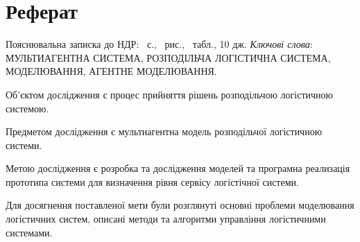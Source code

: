\section*{Реферат}
Пояснювальна записка до НДР: \pageref{LastPage}~с., \totalfigures~рис., \totaltables~табл., 10 дж. \bigbreak
\textit{Ключові слова}: \MakeUppercase{мультиагентна система, розподільча логістична система, моделювання, агентне моделювання}. \bigbreak

Об'єктом дослідження є процес прийняття рішень розподільчою логістичною системою. 

Предметом дослідження є мультиагентна модель розподільчої логістичною системи.

Метою дослідження є розробка та дослідження моделей та програмна реализація прототипа системи для визначення рівня сервісу логістічної системи.

Для досягнення поставленої мети були розглянуті основні проблеми моделювання логістичних систем, описані методи та алгоритми управління логістичними системами.
